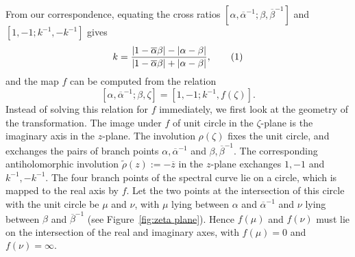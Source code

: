 \documentclass{article}
\numberwithin{equation}{section}
\numberwithin{figure}{section}
\newcommand{\labelthis}[1]{\addtocounter{equation}{1}\tag{\theequation}\label{#1}}
\renewcommand*{\bar}{\overline}
\newcommand{\abs}[1]{\left|#1\right|}
\newcommand{\cji}[1]{\overline{#1}^{-1}}
\begin{document}


From our correspondence, equating the cross ratios $[\alpha,\cji{\alpha};\beta,\cji{\beta}]$ and\\ $[1,-1;k^{-1},-k^{-1}]$ gives
\[
k = \frac{\abs{1-\bar{\alpha}\beta}-\abs{\alpha-\beta}}{\abs{1-\bar{\alpha}\beta}+\abs{\alpha-\beta}},
\labelthis{eqn:def_k}
\]
and the map $f$ can be computed from the relation
\[
[\alpha,\cji{\alpha};\beta,\zeta] = [1,-1;k^{-1},f(\zeta)].
\]
Instead of solving this relation for $f$ immediately, we first look at the geometry of the transformation.
The image under $f$ of unit circle in the $\zeta$-plane is the imaginary axis in the $z$-plane. The involution $\rho(\zeta)$ fixes the unit circle, and exchanges the pairs of branch points $\alpha,\cji{\alpha}$ and $\beta,\cji{\beta}$. The corresponding antiholomorphic involution $\tilde{\rho}(z) := -\bar{z}$ in the $z$-plane exchanges $1,-1$ and $k^{-1},-k^{-1}$. The four branch points of the spectral curve lie on a circle, which is mapped to the real axis by $f$. Let the two points at the intersection of this circle with the unit circle be $\mu$ and $\nu$, with $\mu$ lying between $\alpha$ and $\cji{\alpha}$ and $\nu$ lying between $\beta$ and $\cji{\beta}$ (see Figure~\ref{fig:zeta plane}). Hence $f(\mu)$ and $f(\nu)$ must lie on the intersection of the real and imaginary axes, with $f(\mu) = 0$ and $f(\nu) = \infty$.
\end{document}
